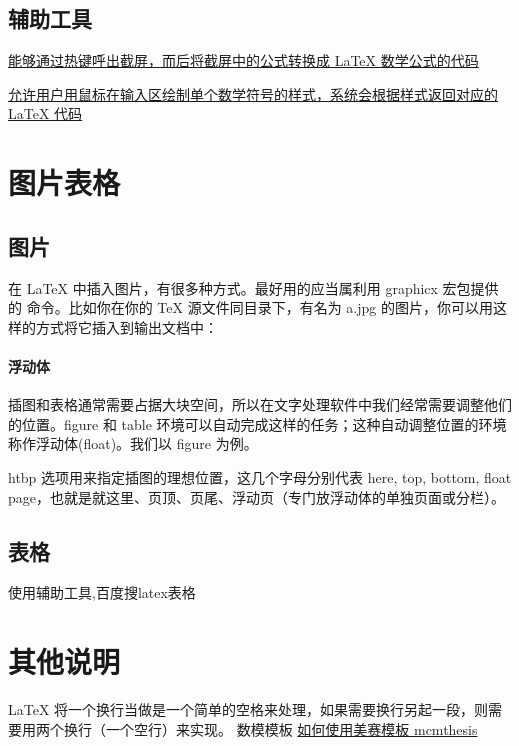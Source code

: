\documentclass[UTF8]{ctexart}
\begin{document}
	\subsection{辅助工具}
	
	\href{https://mathpix.com/ }{能够通过热键呼出截屏，而后将截屏中的公式转换成 LaTeX 数学公式的代码}
	
	\href{http://detexify.kirelabs.org/classify.html}{允许用户用鼠标在输入区绘制单个数学符号的样式，系统会根据样式返回对应的 LaTeX 代码}
	
	
	\section{图片表格}
	\subsection{图片}
	在 LaTeX 中插入图片，有很多种方式。最好用的应当属利用 graphicx 宏包提供的 %
	命令。比如你在你的 TeX 源文件同目录下，有名为 a.jpg 的图片，你可以用这样的方式将它插入到输出文档中：
	
	\paragraph{浮动体}
	插图和表格通常需要占据大块空间，所以在文字处理软件中我们经常需要调整他们的位置。figure 和 table 环境可以自动完成这样的任务；这种自动调整位置的环境称作浮动体(float)。我们以 figure 为例。
	
	
	htbp 选项用来指定插图的理想位置，这几个字母分别代表 here, top, bottom, float page，也就是就这里、页顶、页尾、浮动页（专门放浮动体的单独页面或分栏）。
	
	\subsection{表格}
	使用辅助工具,百度搜latex表格
	
	
	\section{其他说明}
	LaTeX 将一个换行当做是一个简单的空格来处理，如果需要换行另起一段，则需要用两个换行（一个空行）来实现。
	数模模板 
	\href{https://liam.page/2016/01/27/how-to-use-mcmthesis/}{如何使用美赛模板 mcmthesis}
	
	
\end{document}
